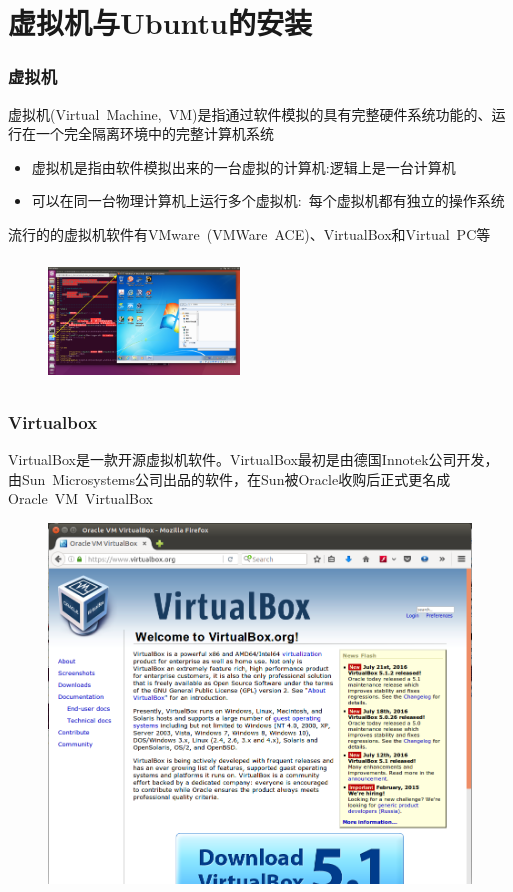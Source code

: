 \appendix
\section{虚拟机与\rm{Ubuntu}的安装}
\frame
{
	\frametitle{虚拟机}
	虚拟机\textrm{(Virtual~Machine,~VM)}是指通过软件模拟的具有完整硬件系统功能的、运行在一个完全隔离环境中的完整计算机系统
	\begin{itemize}
		\item 虚拟机是指由软件模拟出来的一台虚拟的计算机:逻辑上是一台计算机
		\item 可以在同一台物理计算机上运行多个虚拟机:~每个虚拟机都有独立的操作系统
	\end{itemize}
	流行的的虚拟机软件有\textrm{VMware~(VMWare~ACE)}、\textrm{VirtualBox}和\textrm{Virtual~PC}等
\begin{figure}[h!]
\centering
\vspace{-14.5pt}
\includegraphics[height=1.3in,width=2.0in,viewport=0 0 1580 1000,clip]{Figures/Virtualbox-Lin-Win.png}
\caption{\textrm{\fontsize{6.2pt}{5.2pt}\selectfont{The Virtualbox installed in Ubuntu.}}}
\label{Virtualbox-Lin-Win}
\end{figure}
}

\frame
{
	\frametitle{\textrm{Virtualbox}}
	\textrm{VirtualBox}是一款开源虚拟机软件。\textrm{VirtualBox}最初是由德国\textrm{Innotek}公司开发，由\textrm{Sun~Microsystems}公司出品的软件，在\textrm{Sun}被\textrm{Oracle}收购后正式更名成\textrm{Oracle~VM~VirtualBox}
\begin{figure}[h!]
\centering
\vspace{-1.5pt}
\includegraphics[height=0.525\textwidth]{Figures/Virtualbox-http.png}
\caption{\textrm{\fontsize{6.2pt}{5.2pt}\selectfont{The homepage of Virtualbox.}}}
\label{Virtualbox-http}
\end{figure}
}

